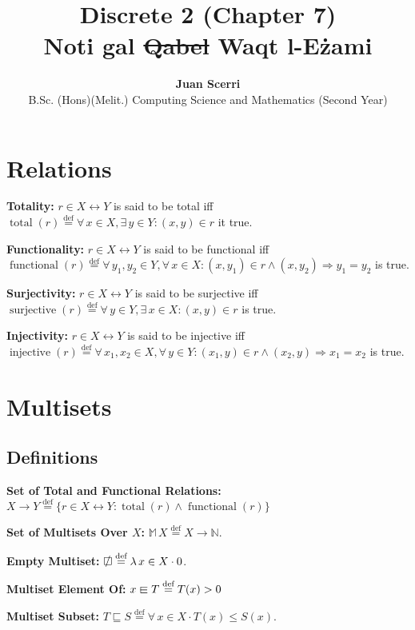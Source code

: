 \documentclass[12pt]{article}
\title{Discrete 2 (Chapter 7)\\
\vspace{0.75em}\textbf{Noti g\mh al \st{Qabel} Waqt l-E\.zami}}
\author {{\textbf{Juan Scerri}}\\
B.Sc. (Hons)(Melit.) Computing Science and Mathematics (Second Year)}
\newcommand{\defeq}{\stackrel{\text{def}}{=}}
\newcommand{\sqemptyset}{\ensurestackMath{\stackinset{c}{}{c}{}{/}{\square}}}
\newcommand{\sqin}{%
  \mathrel{\vphantom{\sqsubset}\text{%
    \mathsurround=0pt
    \ooalign{$\sqsubset$\cr$-$\cr}%
  }}%
}
\theoremstyle{plain}
\begin{document}
\maketitle %

\thispagestyle{empty} %

\raggedright

\section{Relations}

\textbf{Totality:} $r \in X \leftrightarrow Y$ is said to be
total iff $\operatorname{total}(r) \defeq \forall\, x \in X,
\exists\, y \in Y : (x, y) \in r$ it true.

\textbf{Functionality:} $r \in X \leftrightarrow Y$ is said to
be functional iff $\operatorname{functional}(r) \defeq\forall\,
y_1, y_2 \in Y, \forall\, x \in X : (x, y_1) \in r \land (x,
y_2) \Rightarrow y_1 = y_2$ is true.

\textbf{Surjectivity:} $r \in X \leftrightarrow Y$ is said to be
surjective iff $\operatorname{surjective}(r) \defeq\forall\, y
\in Y, \exists\, x \in X : (x, y) \in r$ is true.

\textbf{Injectivity:} $r \in X \leftrightarrow Y$ is said to be
injective iff $\operatorname{injective}(r) \defeq \forall\, x_1,
x_2 \in X, \forall\, y \in Y : (x_1, y) \in r \land (x_2, y)
\Rightarrow x_1 = x_2$ is true.

\section{Multisets}

\subsection{Definitions}

\textbf{Set of Total and Functional Relations:} $X \rightarrow Y
\defeq \{r \in X \leftrightarrow Y : \operatorname{total}(r)
\land \operatorname{functional}(r) \}$

\textbf{Set of Multisets Over $X$:} $\mathbb{M}\,X \defeq X
\rightarrow \mathbb{N}$.

\textbf{Empty Multiset:} $\sqemptyset \defeq \lambda\, x \in X
\cdot 0$.

\textbf{Multiset Element Of:} $x \sqin T \defeq T(x) > 0$

\textbf{Multiset Subset:} $T \sqsubseteq S \defeq \forall\, x
\in X \cdot T(x) \leq S(x)$.
\end{document}
